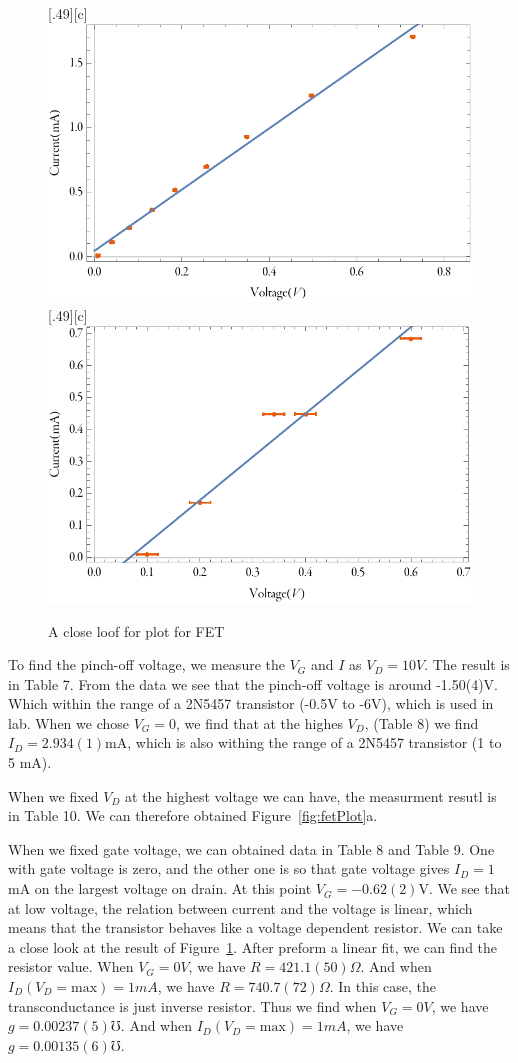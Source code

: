 \documentclass[aps,prl,reprint]{revtex4-1}
\begin{document}
    \begin{figure}[t!]
    \centering
    [.49\linewidth][c]{%
        \includegraphics[width=.4\linewidth]{image/fit1.pdf}}\quad
    [.49\linewidth][c]{%
        \includegraphics[width=.4\linewidth]{image/fit2.pdf}}
    \caption{A close loof for plot for FET}
    \label{fig:fetPlotClose}
    \end{figure}

To find the pinch-off voltage, we measure the $V_G$ and $I$ as $V_D = 10V$. The result is in Table 7. From the data we see that the pinch-off voltage is around -1.50(4)V. Which within the range of a 2N5457 transistor\cite{jfet} (-0.5V to -6V), which is used in lab. When we chose $V_G = 0$, we find that at the highes $V_D$, (Table 8) we find $I_D = 2.934(1)$mA, which is also withing the range of a 2N5457 transistor\cite{jfet} (1 to 5 mA). 

When we fixed $V_D$ at the highest voltage we can have, the measurment resutl is in Table 10. We can therefore obtained Figure~\ref{fig:fetPlot}a.

When we fixed gate voltage, we can obtained data in Table 8 and Table 9. One with gate voltage is zero, and the other one is so that gate voltage gives $I_D = 1$mA on the largest voltage on drain. At this point $V_G = -0.62(2)$V. We see that at low voltage, the relation between current and the voltage is linear, which means that the transistor behaves like a voltage dependent resistor. We can take a close look at the result of Figure~\ref{fig:fetPlotClose}. After preform a linear fit, we can find the resistor value. When $V_G = 0V$, we have $R = 421.1(50)\Omega$. And when $I_D(V_D = \text{max}) = 1mA$, we have $R = 740.7(72)\Omega$. In this case, the transconductance is just inverse resistor. Thus we find when $V_G = 0V$, we have $g = 0.00237(5)\mho$. And when $I_D(V_D = \text{max}) = 1mA$, we have $g = 0.00135(6)\mho$.
\end{document}
